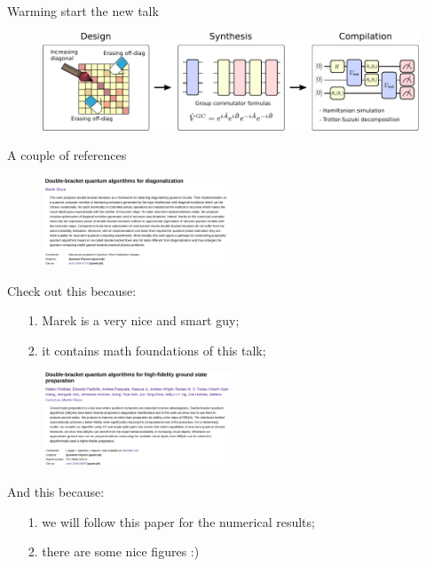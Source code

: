 \documentclass[aspectratio=169, 8pt, xcolor={svgnames}]{beamer}
\begin{document}
\begin{frame}{Warming start the new talk}
\begin{figure}
   \includegraphics[width=1\textwidth]{figures/3_phases_dbqa.pdf}
\end{figure}
\end{frame}

\subtitle{\texttt{PART 2:} Interfacing DBQAs with other techniques}
\date{5 December 2024}

\begin{frame}{}
\maketitle
\end{frame}

\begin{frame}{A couple of references}
\begin{multicols}{2}
\begin{figure}
   \includegraphics[width=0.5\textwidth]{figures/dbqa_paper.png}
\end{figure}
Check out this because:
\begin{itemize}[noitemsep]
\item[1.] Marek is a very nice and smart guy;
\item[2.] it contains math foundations of this talk; 
\end{itemize}
\begin{figure}
   \includegraphics[width=0.5\textwidth]{figures/boostvqe_paper.png}
\end{figure}
And this because:
\begin{itemize}[noitemsep]
\item[1.] we will follow this paper for the numerical results;
\item[2.] there are some nice figures :) 
\end{itemize}
\end{multicols}
\end{frame}
\end{document}
